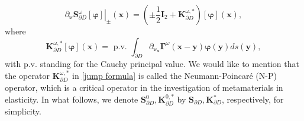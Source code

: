 \documentclass[10pt,reqno,oneside]{amsart}%
\theoremstyle{definition}
\theoremstyle{remark}
\numberwithin{equation}{section}
\numberwithin{equation}{section}
\begin{document}
\begin{equation}\label{jump formula}
\left.\partial_{\boldsymbol{\nu}} \mathbf{S}_{\partial D}^{\omega}[\boldsymbol{\varphi}]\right|_{ \pm}(\mathbf{x})=\left( \pm \frac{1}{2} \mathbf{I}_2+\mathbf{K}_{\partial D}^{\omega, *}\right)[\boldsymbol{\varphi}](\mathbf{x}), %
\end{equation}
where
$$
\mathbf{K}_{\partial D}^{\omega, *}[\boldsymbol{\varphi}](\mathbf{x})=\text { p.v. } \int_{\partial D} \partial_{\boldsymbol{\nu}_{\mathbf{x}}} \boldsymbol{\Gamma}^{\omega}(\mathbf{x}-\mathbf{y}) \boldsymbol{\varphi}(\mathbf{y}) d s(\mathbf{y}),
$$
with p.v. standing for the Cauchy principal value. We would like to mention that the operator $\mathbf{K}_{\partial D}^{\omega, *}$ in \eqref{jump formula} is called the Neumann-Poincar\'e (N-P) operator, which is a critical operator in the investigation of metamaterials in elasticity. In what follows, we denote $\mathbf{S}_{\partial D}^{0}, \mathbf{K}_{\partial D}^{0, *}$ by $\mathbf{S}_{\partial D}, \mathbf{K}_{\partial D}^{*}$, respectively, for simplicity.
\end{document}
